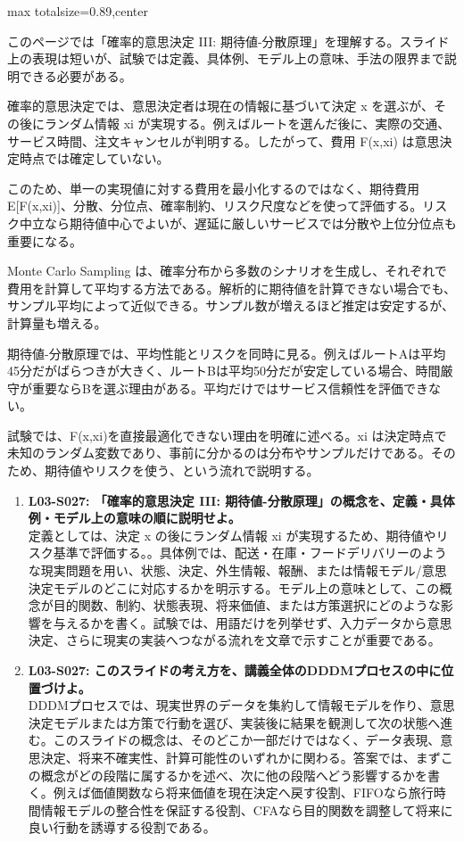 \begin{minipage}[t]{0.58\textwidth}
\begin{adjustbox}{max totalsize={\textwidth}{0.89\textheight},center}
\begin{minipage}{\textwidth}\scriptsize
{}このページでは「確率的意思決定 III: 期待値-分散原理」を理解する。スライド上の表現は短いが、試験では定義、具体例、モデル上の意味、手法の限界まで説明できる必要がある。\par
確率的意思決定では、意思決定者は現在の情報に基づいて決定 x を選ぶが、その後にランダム情報 xi が実現する。例えばルートを選んだ後に、実際の交通、サービス時間、注文キャンセルが判明する。したがって、費用 F(x,xi) は意思決定時点では確定していない。\par
このため、単一の実現値に対する費用を最小化するのではなく、期待費用 E[F(x,xi)]、分散、分位点、確率制約、リスク尺度などを使って評価する。リスク中立なら期待値中心でよいが、遅延に厳しいサービスでは分散や上位分位点も重要になる。\par
Monte Carlo Sampling は、確率分布から多数のシナリオを生成し、それぞれで費用を計算して平均する方法である。解析的に期待値を計算できない場合でも、サンプル平均によって近似できる。サンプル数が増えるほど推定は安定するが、計算量も増える。\par
期待値-分散原理では、平均性能とリスクを同時に見る。例えばルートAは平均45分だがばらつきが大きく、ルートBは平均50分だが安定している場合、時間厳守が重要ならBを選ぶ理由がある。平均だけではサービス信頼性を評価できない。\par
試験では、F(x,xi)を直接最適化できない理由を明確に述べる。xi は決定時点で未知のランダム変数であり、事前に分かるのは分布やサンプルだけである。そのため、期待値やリスクを使う、という流れで説明する。\par{}\begin{enumerate}\item \textbf{L03-S027: 「確率的意思決定 III: 期待値-分散原理」の概念を、定義・具体例・モデル上の意味の順に説明せよ。}\\定義としては、決定 x の後にランダム情報 xi が実現するため、期待値やリスク基準で評価する。。具体例では、配送・在庫・フードデリバリーのような現実問題を用い、状態、決定、外生情報、報酬、または情報モデル/意思決定モデルのどこに対応するかを明示する。モデル上の意味として、この概念が目的関数、制約、状態表現、将来価値、または方策選択にどのような影響を与えるかを書く。試験では、用語だけを列挙せず、入力データから意思決定、さらに現実の実装へつながる流れを文章で示すことが重要である。\item \textbf{L03-S027: このスライドの考え方を、講義全体のDDDMプロセスの中に位置づけよ。}\\DDDMプロセスでは、現実世界のデータを集約して情報モデルを作り、意思決定モデルまたは方策で行動を選び、実装後に結果を観測して次の状態へ進む。このスライドの概念は、そのどこか一部だけではなく、データ表現、意思決定、将来不確実性、計算可能性のいずれかに関わる。答案では、まずこの概念がどの段階に属するかを述べ、次に他の段階へどう影響するかを書く。例えば価値関数なら将来価値を現在決定へ戻す役割、FIFOなら旅行時間情報モデルの整合性を保証する役割、CFAなら目的関数を調整して将来に良い行動を誘導する役割である。\end{enumerate}

\end{minipage}
\end{adjustbox}
\end{minipage}
